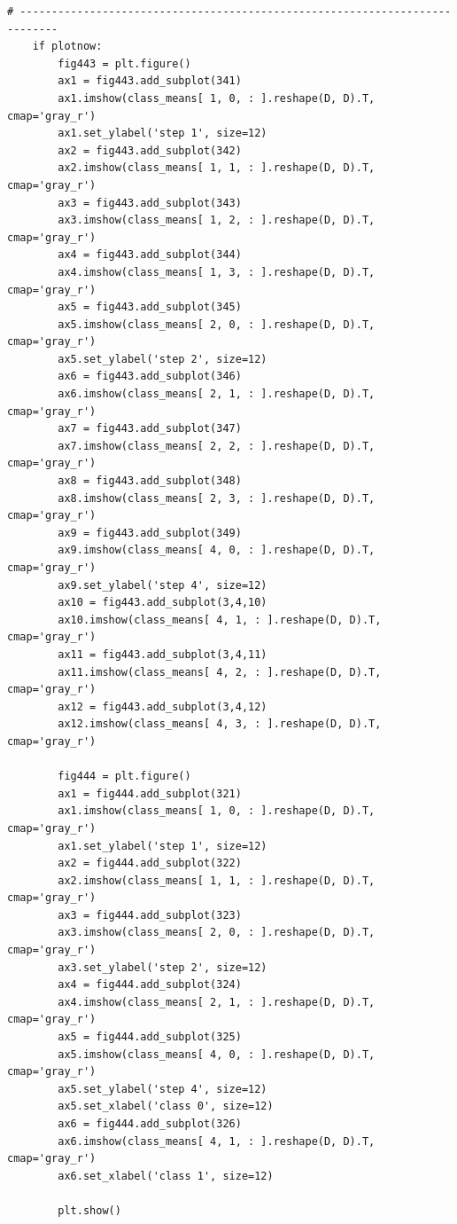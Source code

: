 \begin{verbatim}
# ----------------------------------------------------------------------------
    if plotnow:
        fig443 = plt.figure()
        ax1 = fig443.add_subplot(341)
        ax1.imshow(class_means[ 1, 0, : ].reshape(D, D).T, cmap='gray_r')
        ax1.set_ylabel('step 1', size=12)
        ax2 = fig443.add_subplot(342)
        ax2.imshow(class_means[ 1, 1, : ].reshape(D, D).T, cmap='gray_r')
        ax3 = fig443.add_subplot(343)
        ax3.imshow(class_means[ 1, 2, : ].reshape(D, D).T, cmap='gray_r')
        ax4 = fig443.add_subplot(344)
        ax4.imshow(class_means[ 1, 3, : ].reshape(D, D).T, cmap='gray_r')
        ax5 = fig443.add_subplot(345)
        ax5.imshow(class_means[ 2, 0, : ].reshape(D, D).T, cmap='gray_r')
        ax5.set_ylabel('step 2', size=12)
        ax6 = fig443.add_subplot(346)
        ax6.imshow(class_means[ 2, 1, : ].reshape(D, D).T, cmap='gray_r')
        ax7 = fig443.add_subplot(347)
        ax7.imshow(class_means[ 2, 2, : ].reshape(D, D).T, cmap='gray_r')
        ax8 = fig443.add_subplot(348)
        ax8.imshow(class_means[ 2, 3, : ].reshape(D, D).T, cmap='gray_r')
        ax9 = fig443.add_subplot(349)
        ax9.imshow(class_means[ 4, 0, : ].reshape(D, D).T, cmap='gray_r')
        ax9.set_ylabel('step 4', size=12)
        ax10 = fig443.add_subplot(3,4,10)
        ax10.imshow(class_means[ 4, 1, : ].reshape(D, D).T, cmap='gray_r')
        ax11 = fig443.add_subplot(3,4,11)
        ax11.imshow(class_means[ 4, 2, : ].reshape(D, D).T, cmap='gray_r')
        ax12 = fig443.add_subplot(3,4,12)
        ax12.imshow(class_means[ 4, 3, : ].reshape(D, D).T, cmap='gray_r')

        fig444 = plt.figure()
        ax1 = fig444.add_subplot(321)
        ax1.imshow(class_means[ 1, 0, : ].reshape(D, D).T, cmap='gray_r')
        ax1.set_ylabel('step 1', size=12)
        ax2 = fig444.add_subplot(322)
        ax2.imshow(class_means[ 1, 1, : ].reshape(D, D).T, cmap='gray_r')
        ax3 = fig444.add_subplot(323)
        ax3.imshow(class_means[ 2, 0, : ].reshape(D, D).T, cmap='gray_r')
        ax3.set_ylabel('step 2', size=12)
        ax4 = fig444.add_subplot(324)
        ax4.imshow(class_means[ 2, 1, : ].reshape(D, D).T, cmap='gray_r')
        ax5 = fig444.add_subplot(325)
        ax5.imshow(class_means[ 4, 0, : ].reshape(D, D).T, cmap='gray_r')
        ax5.set_ylabel('step 4', size=12)
        ax5.set_xlabel('class 0', size=12)
        ax6 = fig444.add_subplot(326)
        ax6.imshow(class_means[ 4, 1, : ].reshape(D, D).T, cmap='gray_r')
        ax6.set_xlabel('class 1', size=12)

        plt.show()
\end{verbatim}